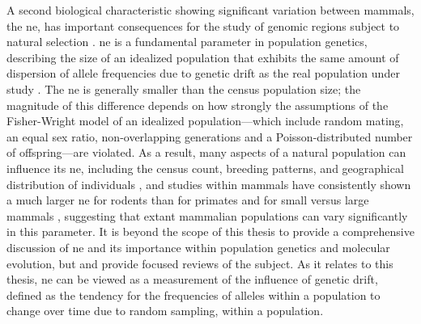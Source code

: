 A second biological characteristic showing significant variation
between mammals, the \ac{ne}, has important consequences for the study
of genomic regions subject to natural selection
\citep{Charlesworth2009}. \ac{ne} is a fundamental parameter in
population genetics, describing the size of an idealized population
that exhibits the same amount of dispersion of allele frequencies due
to genetic drift as the real population under study
\citep{Wright1931,Woolfit2009}. The \ac{ne} is generally smaller than
the census population size; the magnitude of this difference depends
on how strongly the assumptions of the Fisher-Wright model of an
idealized population---which include random mating, an equal sex
ratio, non-overlapping generations and a Poisson-distributed number of
offspring---are violated. As a result, many aspects of a natural
population can influence its \ac{ne}, including the census count,
breeding patterns, and geographical distribution of individuals
\citep{Caballero1994}, and studies within mammals have consistently
shown a much larger \ac{ne} for rodents than for primates and for
small versus large mammals
\citep{EyreWalker2002,Popadin2007,Halligan2010}, suggesting that
extant mammalian populations can vary significantly in this
parameter. It is beyond the scope of this thesis to provide a
comprehensive discussion of \ac{ne} and its importance within
population genetics and molecular evolution, but \citet{Woolfit2009}
and \citet{Charlesworth2009} provide focused reviews of the
subject. As it relates to this thesis, \ac{ne} can be viewed as a
measurement of the influence of genetic drift, defined as the tendency
for the frequencies of alleles within a population to change over time
due to random sampling, within a population.


